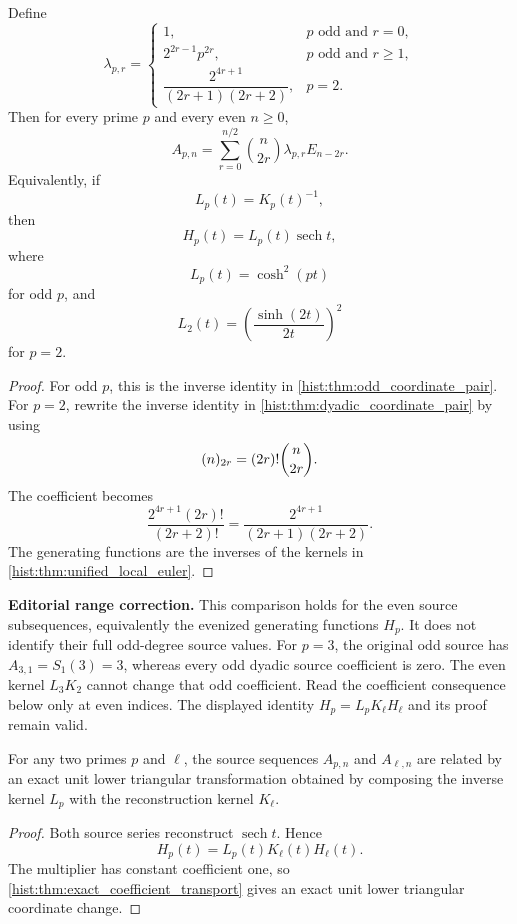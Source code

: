 \begin{histtheorem}\label{hist:thm:unified_inverse_local_euler}
Define
\[
\lambda_{p,r}
=
\begin{cases}
1,&p\text{ odd and }r=0,\\
2^{2r-1}p^{2r},&p\text{ odd and }r\geq1,\\
\dfrac{2^{4r+1}}{(2r+1)(2r+2)},&p=2.
\end{cases}
\]
Then for every prime \(p\) and every even \(n\geq0\),
\[
\boxed{
A_{p,n}
=
\sum_{r=0}^{n/2}
\binom n{2r}
\lambda_{p,r}
E_{n-2r}.
}
\]
Equivalently, if
\[
L_p(t)=K_p(t)^{-1},
\]
then
\[
\boxed{H_p(t)=L_p(t)\operatorname{sech}t,}
\]
where
\[
L_p(t)=\cosh^2(pt)
\]
for odd \(p\), and
\[
L_2(t)=\left(\frac{\sinh(2t)}{2t}\right)^2
\]
for \(p=2\).
\end{histtheorem}

\begin{proof}
For odd \(p\), this is the inverse identity in \cref{hist:thm:odd_coordinate_pair}. For \(p=2\), rewrite the inverse identity in \cref{hist:thm:dyadic_coordinate_pair} by using
\[
(n)_{2r}=(2r)!\binom n{2r}.
\]
The coefficient becomes
\[
\frac{2^{4r+1}(2r)!}{(2r+2)!}
=
\frac{2^{4r+1}}{(2r+1)(2r+2)}.
\]
The generating functions are the inverses of the kernels in \cref{hist:thm:unified_local_euler}.
\end{proof}

\begin{histcorollary}\label{hist:cor:local_source_change}
\par\noindent\textbf{Editorial range correction.} This comparison holds for the even source subsequences, equivalently the evenized generating functions $H_p$. It does not identify their full odd-degree source values. For $p=3$, the original odd source has $A_{3,1}=S_1(3)=3$, whereas every odd dyadic source coefficient is zero. The even kernel $L_3K_2$ cannot change that odd coefficient. Read the coefficient consequence below only at even indices. The displayed identity $H_p=L_pK_\ell H_\ell$ and its proof remain valid.\par\medskip
For any two primes \(p\) and \(\ell\), the source sequences \(A_{p,n}\) and \(A_{\ell,n}\) are related by an exact unit lower triangular transformation obtained by composing the inverse kernel \(L_p\) with the reconstruction kernel \(K_\ell\).
\end{histcorollary}

\begin{proof}
Both source series reconstruct \(\operatorname{sech}t\). Hence
\[
H_p(t)=L_p(t)K_\ell(t)H_\ell(t).
\]
The multiplier has constant coefficient one, so \cref{hist:thm:exact_coefficient_transport} gives an exact unit lower triangular coordinate change.
\end{proof}

